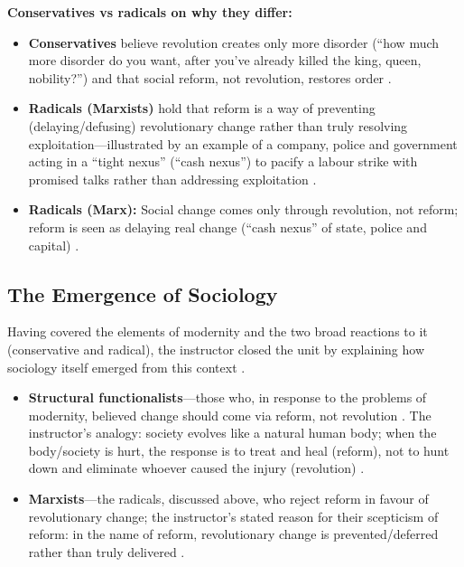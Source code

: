 \begin{CriticalPoint}
\textbf{Conservatives vs radicals on why they differ:}
\begin{itemize}
    \item \textbf{Conservatives} believe revolution creates only more disorder (``how much more disorder do you want, after you've already killed the king, queen, nobility?'') and that social reform, not revolution, restores order .
    \item \textbf{Radicals (Marxists)} hold that reform is a way of preventing (delaying/defusing) revolutionary change rather than truly resolving exploitation---illustrated by an example of a company, police and government acting in a ``tight nexus'' (``cash nexus'') to pacify a labour strike with promised talks rather than addressing exploitation .
\end{itemize}
\end{CriticalPoint}

\begin{QuickRevision}
\begin{itemize}
    \item \textbf{Radicals (Marx):} Social change comes only through revolution, not reform; reform is seen as delaying real change (``cash nexus'' of state, police and capital) .
\end{itemize}
\end{QuickRevision}

\subsection{The Emergence of Sociology}
Having covered the elements of modernity and the two broad reactions to it (conservative and radical), the instructor closed the unit by explaining how sociology itself emerged from this context .

\begin{KeyConcept}
\begin{itemize}
    \item \textbf{Structural functionalists}---those who, in response to the problems of modernity, believed change should come via reform, not revolution . The instructor's analogy: society evolves like a natural human body; when the body/society is hurt, the response is to treat and heal (reform), not to hunt down and eliminate whoever caused the injury (revolution) .
    \item \textbf{Marxists}---the radicals, discussed above, who reject reform in favour of revolutionary change; the instructor's stated reason for their scepticism of reform: in the name of reform, revolutionary change is prevented/deferred rather than truly delivered .
\end{itemize}
\end{KeyConcept}

